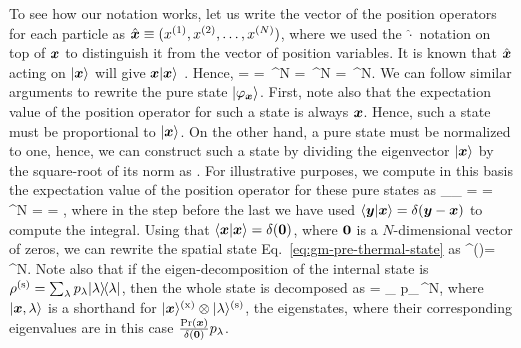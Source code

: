 To see how our notation works, let us write the vector of the position operators for each particle as $\hat{\boldsymbol{x}}\equiv(x^{(1)},x^{(2)},\dots,x^{(N)})$, where we used the $\hat{\cdot}$ notation on top of $\boldsymbol{x}$ to distinguish it from the vector of position variables.
It is known that $\hat{\boldsymbol{x}}$ acting on $\vert{\ensuremath{\boldsymbol{x}}}\rangle$ will give $\boldsymbol{x}\vert{\ensuremath{\boldsymbol{x}}}\rangle$ \cite{Sakurai2010, Cohen-Tannoudji1977}.
Hence,
\be
   = \mtxid =  \int {}\,^N = \int {} \,^N = \int {} \,^N.
\ee
We can follow similar arguments to rewrite the pure state $\vert{\varphi_{\ensuremath{\boldsymbol{x}}}}\rangle$.
First, note also that the expectation value of the position operator for such a state is always $\boldsymbol{x}$.
Hence, such a state must be proportional to $\vert{\ensuremath{\boldsymbol{x}}}\rangle$.
On the other hand, a pure state must be normalized to one, hence, we can construct such a state by dividing the eigenvector $\vert{\ensuremath{\boldsymbol{x}}}\rangle$ by the square-root of its norm as
\be
   \equiv {}.
\ee
For illustrative purposes, we compute in this basis the expectation value of the position operator for these pure states as
\be
  _{\varphi_{}} =  =
  \int {}
  {} \,^N =
   =
  ,
\ee
where in the step before the last we have used $\langle{\ensuremath{\boldsymbol{y}}}\vert{\ensuremath{\boldsymbol{x}}}\rangle=\delta(\boldsymbol{y}-\boldsymbol{x})$ to compute the integral.
Using that $\langle{\ensuremath{\boldsymbol{x}}}\vert{\ensuremath{\boldsymbol{x}}}\rangle=\delta(\boldsymbol{0})$, where $\boldsymbol{0}$ is a $N$-dimensional vector of zeros, we can rewrite the spatial state Eq.~\eqref{eq:gm-pre-thermal-state} as
\be
  \rho^{()}=\int {} \,^N.
  \label{eq:gm-thermal-state}
\ee
Note also that if the eigen-decomposition of the internal state is $\rho^{(\text{s})} = \sum_{\lambda} p_{\lambda}\vert{\lambda}\rangle{\!}\langle{\lambda}\vert$, then the whole state is decomposed as
\be
  \rho = \int\sum_{\lambda}  p_\lambda {}\,^N,
  \label{eq:gm-eigendecomposition-of-state}
\ee
where $\vert{\ensuremath{\boldsymbol{x}},\lambda}\rangle$ is a shorthand for $\vert{\ensuremath{\boldsymbol{x}}}\rangle^{(\text{x})}\otimes\vert{\lambda}\rangle^{(\text{s})}$, the eigenstates, where their corresponding eigenvalues are in this case $\frac{\text{Pr}(\boldsymbol{x})}{\delta(\boldsymbol{0})} p_\lambda$.

